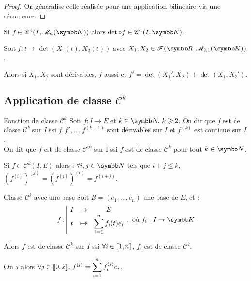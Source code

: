 \begin{proof}
    On généralise celle réalisée pour une application bilinéaire via une récurrence.
\end{proof}

\begin{corollaire}{}{}
    Si $f \in \mathscr C^1(I, \mathscr M_n(\K))$ alors $\det \circ f \in \mathscr C^1(I, \K)$.
\end{corollaire}

\begin{exemple}
    Soit $f: t \to \det(X_1(t), X_2(t))$ avec $X_1, X_2 \in \mathscr F(\R, \mathscr M_{2, 1}(\K))$. 

    Alors si $X_1, X_2$ sont dérivables, $f$ aussi et 
    $f' = \det(X_1', X_2) + \det(X_1, X_2')$.
\end{exemple}

\subsection{Application de classe \texorpdfstring{$\mathscr C^k$}{Ck}}

\begin{definition}{Fonction de classe $\mathscr C^k$}{}
    Soit $f : I \to E$ et $k \in \N, \, k \geqslant 2$. On dit que $f$ est de classe 
    $\mathscr C^k$ sur $I$ ssi $f, f', \ldots, f^{(k-1)}$ sont dérivables sur $I$ et $f^{(k)}$ est continue sur $I$. \\

    On dit que $f$ est de classe $\mathscr C^\infty$ sur I ssi $f$ est de classe 
    $\mathscr C^k$ pour tout $k \in \N$.
\end{definition}

\begin{remarque}
    Si $f \in \mathscr C^k(I,E)$ alors :
    $\ds \forall i,j \in \N$ tels que $i + j \leqslant k$,
    $\left(f^{(i)}\right)^{(j)} = \left(f^{(j)}\right)^{(i)} = f^{(i+j)}$.
\end{remarque}

\begin{proposition}{Classe $\mathscr C^k$ avec une base}{}
    Soit $B = (e_1, \ldots, e_n)$ une base de $E$, et :
    \[\fonction{f}{I}{E}{t}{\sum_{i=1}^n f_i(t)e_i},~\text{où}~f_i : I \to \K\]

    Alors $f$ est de classe $\mathscr C^k$ sur $I$ ssi $\forall i \in [\![1, n]\!]$, $f_i$ est de classe $\mathscr C^k$. 

    On a alors $\displaystyle \forall j \in [\![0, k]\!], \, f^{(j)} = \sum_{i=1}^n f_i^{(j)}e_i$.
\end{proposition}

